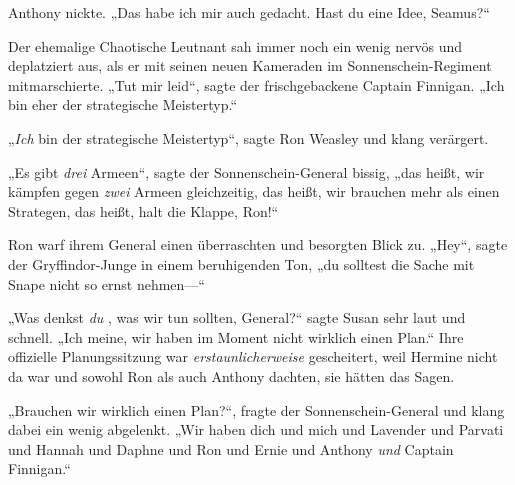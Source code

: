 Anthony nickte. „Das habe ich mir auch gedacht. Hast du eine Idee, Seamus?“

Der ehemalige Chaotische Leutnant sah immer noch ein wenig nervös und deplatziert aus, als er mit seinen neuen Kameraden im Sonnenschein-Regiment mitmarschierte. „Tut mir leid“, sagte der frischgebackene Captain Finnigan. „Ich bin eher der strategische Meistertyp.“

„\emph{Ich} bin der strategische Meistertyp“, sagte Ron Weasley und klang verärgert.

„Es gibt \emph{drei} Armeen“, sagte der Sonnenschein-General bissig, „das heißt, wir kämpfen gegen \emph{zwei} Armeen gleichzeitig, das heißt, wir brauchen mehr als einen Strategen, das heißt, halt die Klappe, Ron!“

Ron warf ihrem General einen überraschten und besorgten Blick zu. „Hey“, sagte der Gryffindor-Junge in einem beruhigenden Ton, „du solltest die Sache mit Snape nicht so ernst nehmen—“

„Was denkst \emph{du} , was wir tun sollten, General?“ sagte Susan sehr laut und schnell. „Ich meine, wir haben im Moment nicht wirklich einen Plan.“ Ihre offizielle Planungssitzung war \emph{erstaunlicherweise} gescheitert, weil Hermine nicht da war und sowohl Ron als auch Anthony dachten, sie hätten das Sagen.

„Brauchen wir wirklich einen Plan?“, fragte der Sonnenschein-General und klang dabei ein wenig abgelenkt. „Wir haben dich und mich und Lavender und Parvati und Hannah und Daphne und Ron und Ernie und Anthony \emph{und} Captain Finnigan.“

